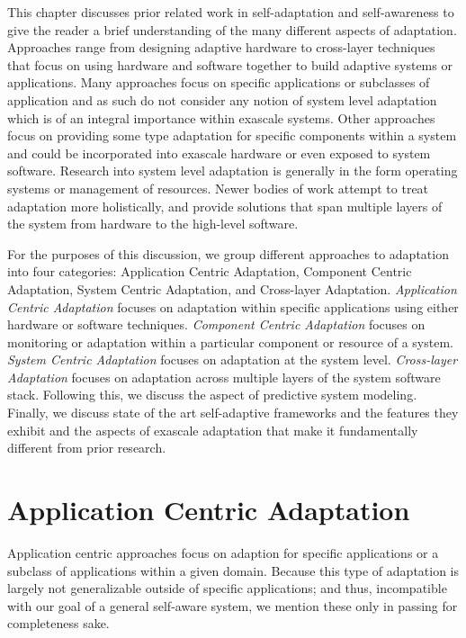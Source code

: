 \label{chap:related_work}
This chapter discusses prior related work in self-adaptation and self-awareness to give the reader a brief understanding of the many different aspects of adaptation. Approaches range from designing adaptive hardware to cross-layer techniques that focus on using hardware and software together to build adaptive systems or applications. Many approaches focus on specific applications or subclasses of application and as such do not consider any notion of system level adaptation which is of an integral importance within exascale systems. Other approaches focus on providing some type adaptation for specific components within a system and could be incorporated into exascale hardware or even exposed to system software. Research into system level adaptation is generally in the form operating systems or management of resources. Newer bodies of work attempt to treat adaptation more holistically, and provide solutions that span multiple layers of the system from hardware to the high-level software.

For the purposes of this discussion, we group different approaches to adaptation into four categories: Application Centric Adaptation, Component Centric Adaptation, System Centric Adaptation, and Cross-layer Adaptation. {\it Application Centric Adaptation} focuses on adaptation within specific applications using either hardware or software techniques. {\it Component Centric Adaptation} focuses on monitoring or adaptation within a particular component or resource of a system. {\it System Centric Adaptation} focuses on adaptation at the system level. {\it Cross-layer Adaptation} focuses on adaptation across multiple layers of the system software stack. Following this, we discuss the aspect of predictive system modeling. Finally, we discuss state of the art self-adaptive frameworks and the features they exhibit and the aspects of exascale adaptation that make it fundamentally different from prior research.

\section{Application Centric Adaptation}
    Application centric approaches focus on adaption for specific applications or a subclass of applications within a given domain. Because this type of adaptation is largely not generalizable outside of specific applications; and thus, incompatible with our goal of a general self-aware system, we mention these only in passing for completeness sake.
    
